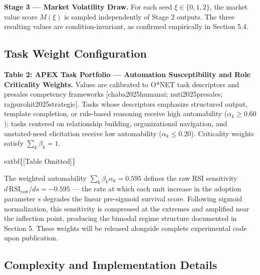 \documentclass[10pt, conference]{IEEEtran}
\begin{document}
\textbf{Stage 3 --- Market Volatility Draw.} For each seed $\xi \in \{0, 1, 2\}$, the market value score $M(\xi)$ is sampled independently of Stage 2 outputs. The three resulting values are condition-invariant, as confirmed empirically in Section 5.4.

\subsection{Task Weight Configuration}

\label{sec:task_weight_configuration}

\textbf{Table 2: APEX Task Portfolio --- Automation Susceptibility and Role Criticality Weights.} Values are calibrated to O*NET task descriptors and presales competency frameworks [chaba2025humanai; nuti2025presales; rajpurohit2025strategic]. Tasks whose descriptors emphasize structured output, template completion, or rule-based reasoning receive high automability ($\alpha_k \geq 0.60$); tasks centered on relationship building, organizational navigation, and unstated-need elicitation receive low automability ($\alpha_k \leq 0.20$). Criticality weights satisfy $\sum_k \beta_k = 1$.

	extbf\{[Table Omitted]\}

The weighted automability $\sum_k \beta_k \alpha_k = 0.595$ defines the raw RSI sensitivity $d\,\text{RSI}_{\text{raw}}/ds = -0.595$ --- the rate at which each unit increase in the adoption parameter $s$ degrades the linear pre-sigmoid survival score. Following sigmoid normalization, this sensitivity is compressed at the extremes and amplified near the inflection point, producing the bimodal regime structure documented in Section 5. These weights will be released alongside complete experimental code upon publication.

\subsection{Complexity and Implementation Details}

\label{sec:complexity_and_implementation_details}
\end{document}

